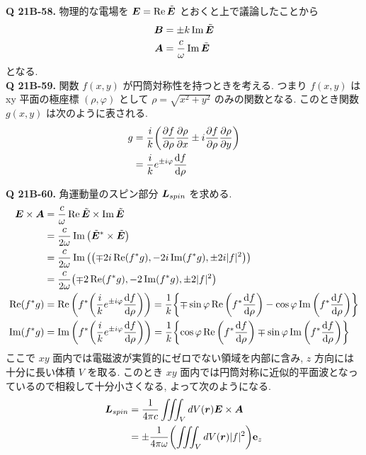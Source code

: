 \documentclass[uplatex,dvipdfmx,a4paper,11pt]{jlreq}
\newcommand{\EE}{\bm{E}}
\newcommand{\BB}{\bm{B}}
\renewcommand{\AA}{\bm{A}}
\newcommand{\rr}{\bm{r}}
\theoremstyle{definition}
\begin{document}
\textbf{Q 21B-58.}
物理的な電場を $\EE = \Re\ET$ とおくと上で議論したことから
\begin{align}
  \BB & = \pm k\Im\ET \label{B tilde E} \\
  \AA & = \frac{c}{\omega}\Im\ET
\end{align}
となる. \\

\textbf{Q 21B-59.}
関数 $f(x,y)$ が円筒対称性を持つときを考える. つまり $f(x,y)$ は xy 平面の極座標 $(\rho, \varphi)$ として $\rho=\sqrt{x^2 + y^2}$ のみの関数となる. このとき関数 $g(x,y)$ は次のように表される.
\begin{align}
  g & = \frac{i}{k}\qty(\pdv{f}{\rho}\pdv{\rho}{x}\pm i\pdv{f}{\rho}\pdv{\rho}{y}) \\
    & = \frac{i}{k}e^{\pm i\varphi}\dv{f}{\rho} \label{def g}
\end{align}

\textbf{Q 21B-60.}
角運動量のスピン部分 $\bm{L}_{spin}$ を求める.
\begin{align}
  \EE \times \AA & = \frac{c}{\omega}\Re\ET\times\Im\ET                                                                                                                           \\
                 & = \frac{c}{2\omega}\Im\qty(\ET^*\times\ET)                                                                                                                     \\
                 & = \frac{c}{2\omega}\Im\qty(\qty(\mp 2\ii\Re(f^*g), -2\ii\Im(f^*g), \pm 2\ii|f|^2))                                                                             \\
                 & = \frac{c}{2\omega}\qty(\mp 2\Re(f^*g), -2\Im(f^*g), \pm 2|f|^2)                                                                                               \\
  \Re(f^*g)      & = \Re\qty(f^*\qty(\frac{\ii}{k}e^{\pm\ii\varphi}\dv{f}{\rho})) = \frac{1}{k}\qty{\mp\sin\varphi\Re\qty(f^*\dv{f}{\rho}) - \cos\varphi\Im\qty(f^*\dv{f}{\rho})} \\
  \Im(f^*g)      & = \Im\qty(f^*\qty(\frac{\ii}{k}e^{\pm\ii\varphi}\dv{f}{\rho})) = \frac{1}{k}\qty{\cos\varphi\Re\qty(f^*\dv{f}{\rho}) \mp \sin\varphi\Im\qty(f^*\dv{f}{\rho})}
\end{align}
ここで $xy$ 面内では電磁波が実質的にゼロでない領域を内部に含み, $z$ 方向には十分に長い体積 $V$ を取る. このとき $xy$ 面内では円筒対称に近似的平面波となっているので相殺して十分小さくなる, よって次のようになる.
\begin{align}
  \LL_{spin} & = \frac{1}{4\pi c}\iiint_V dV(\rr)\EE\times\AA               \\
             & = \pm\frac{1}{4\pi\omega}\qty(\iiint_V dV(\rr)|f|^2)\vb{e}_z
\end{align}
\end{document}
